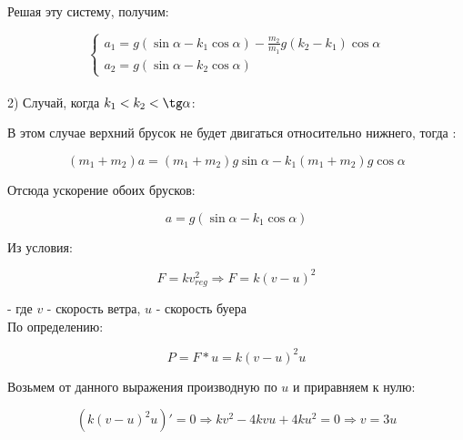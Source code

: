 \documentclass{report}
\begin{document}
Решая эту систему, получим:

\begin{equation}
\begin{cases}
a_1 = g(\sin\alpha - k_1\cos\alpha) - \frac{m_2}{m_1}g(k_2-k_1)\cos\alpha \\
a_2 = g(\sin\alpha - k_2\cos\alpha)
\end{cases}
\end{equation}\\

2) Случай, когда $k_1 < k_2 < \tg \alpha$:

В этом случае верхний брусок не будет двигаться относительно нижнего, тогда :

\begin{equation}
(m_1 + m_2)a = (m_1 + m_2)g\sin\alpha - k_1(m_1 + m_2)g\cos\alpha
\end{equation}

Отсюда ускорение обоих брусков:

\begin{equation}
a = g(\sin\alpha - k_1\cos\alpha)
\end{equation}









\sol Из условия: 
\begin{center}
\begin{equation}
	F=kv_{reg}^2 \Rightarrow F=k(v-u)^2
\end{equation}
\end{center}
- где $v$ - скорость ветра, $u$ - скорость буера\\
По определению: 
\begin{center}
\begin{equation}
P=F*u=k(v-u)^2u 
\end{equation}
\end{center}
Возьмем от данного выражения производную по $u$ и приравняем к нулю:
\begin{center}
\begin{equation}
(k(v-u)^2u)' = 0 \Rightarrow kv^2-4kvu+4ku^2=0 \Rightarrow v=3u
\end{equation}
\end{center}
\end{document}
